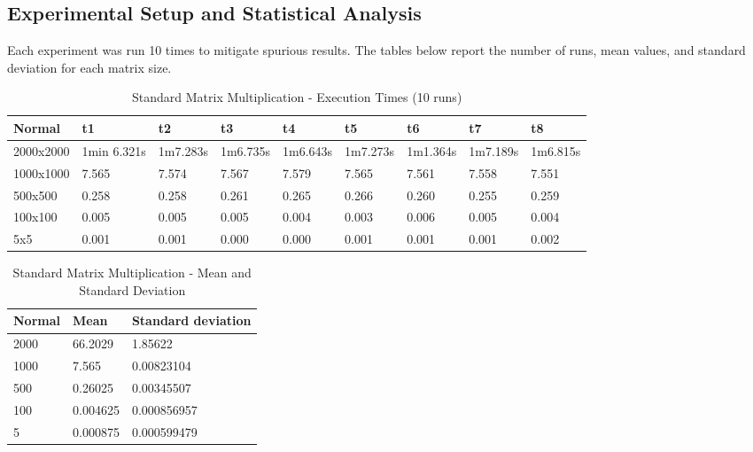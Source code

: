 \documentclass{article}
\begin{document}
\subsection{Experimental Setup and Statistical Analysis}
Each experiment was run 10 times to mitigate spurious results. The tables below report the number of runs, mean values, and standard deviation for each matrix size.

\begin{table}[h]
\centering
\caption{Standard Matrix Multiplication - Execution Times (10 runs)}
\begin{tabular}{|l|l|l|l|l|l|l|l|l|}
\hline
\rowcolor[HTML]{C0C0C0} 
\cellcolor[HTML]{DAE8FC}Normal    & t1          & t2       & t3       & t4       & t5       & t6       & t7       & t8       \\ \hline
\cellcolor[HTML]{EFEFEF}2000x2000 & 1min 6.321s & 1m7.283s & 1m6.735s & 1m6.643s & 1m7.273s & 1m1.364s & 1m7.189s & 1m6.815s \\ \hline
\cellcolor[HTML]{EFEFEF}1000x1000 & 7.565       & 7.574    & 7.567    & 7.579    & 7.565    & 7.561    & 7.558    & 7.551    \\ \hline
\cellcolor[HTML]{EFEFEF}500x500   & 0.258       & 0.258    & 0.261    & 0.265    & 0.266    & 0.260    & 0.255    & 0.259    \\ \hline
\cellcolor[HTML]{EFEFEF}100x100   & 0.005       & 0.005    & 0.005    & 0.004    & 0.003    & 0.006    & 0.005    & 0.004    \\ \hline
\cellcolor[HTML]{EFEFEF}5x5       & 0.001       & 0.001    & 0.000    & 0.000    & 0.001    & 0.001    & 0.001    & 0.002    \\ \hline
\end{tabular}
\end{table}

\begin{table}[h]
\centering
\caption{Standard Matrix Multiplication - Mean and Standard Deviation}
\begin{tabular}{|
>{\columncolor[HTML]{EFEFEF}}l |l|l|}
\hline
\cellcolor[HTML]{DAE8FC}Normal & \cellcolor[HTML]{C0C0C0}Mean & \cellcolor[HTML]{C0C0C0}Standard deviation \\ \hline
2000                           & 66.2029                      & 1.85622                                    \\ \hline
1000                           & 7.565                        & 0.00823104                                 \\ \hline
500                            & 0.26025                      & 0.00345507                                 \\ \hline
100                            & 0.004625                     & 0.000856957                                \\ \hline
5                              & 0.000875                     & 0.000599479                                \\ \hline
\end{tabular}
\end{table}
\end{document}
